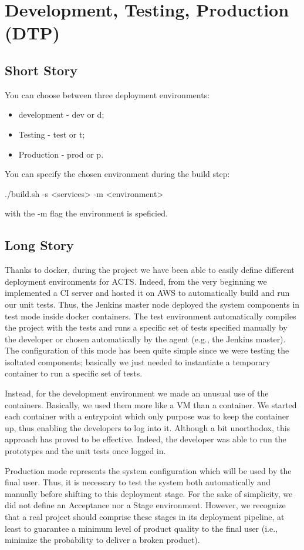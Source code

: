 \section{Development, Testing, Production (DTP)}

\subsection{Short Story}
You can choose between three deployment environments:
\begin{itemize}
\item development - dev or d;
\item Testing - test or t;
\item Production - prod or p.
\end{itemize}

You can specify the chosen environment during the build step:

./build.sh -s <services> -m <environment>

with the -m flag the environment is speficied.

\subsection{Long Story}
Thanks to docker, during the project we have been able to easily define different
deployment environments for ACTS. Indeed, from the very beginning we implemented a CI server and hosted it
on AWS to automatically build and run our unit tests. Thus, the Jenkins master node deployed the
system components in test mode inside docker containers.
The test environment automatically compiles the project with the tests and
runs a specific set of tests specified manually by the developer or chosen automatically by
the agent (e.g., the Jenkins master). The configuration of this mode has been quite simple since
we were testing the isoltated components; basically we just needed to instantiate a temporary
container to run a specific set of tests.

Instead, for the development environment we made an unusual use of the containers. Basically, we
used them more like a VM than a container. We started each container with a entrypoint which
only purpose was to keep the container up, thus enabling the developers to log into it.
Although a bit unorthodox, this approach has proved to be effective. Indeed, the developer
was able to run the prototypes and the unit tests once logged in.

Production mode represents the system configuration which will be used by the final user. Thus, it is necessary
to test the system both automatically and manually before shifting to this deployment stage. For the sake of
simplicity, we did not define an Acceptance nor a Stage environment. However, we recognize that a real project should comprise these
stages in its deployment pipeline, at least to guarantee a minimum level of product quality to the final user (i.e., minimize the probability to deliver a broken product).
